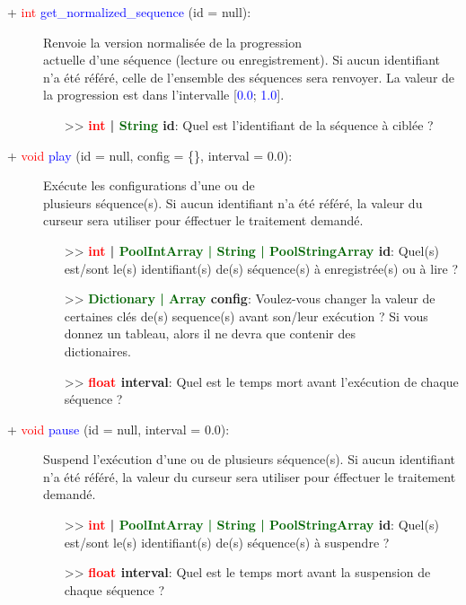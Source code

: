 \documentclass[a4paper, 11pt]{article}
\begin{document}
	\begin{description}
		\item [+ \textcolor{red}{int} \textcolor{blue}{get\_normalized\_sequence} (id = null):] Renvoie la
		version normalisée de la progression \\actuelle d'une séquence (lecture ou enregistrement). Si aucun 
		identifiant n'a été référé, celle de l'ensemble des séquences sera renvoyer. La valeur de la
		progression est dans l'intervalle [\textcolor{blue}{0.0}; \textcolor{blue}{1.0}].
		\begin{itemize}
			\item [>> \textbf{\textcolor{red}{int} | \textcolor{darkgreen}{String} id}:] Quel est
			l'identifiant de la séquence à ciblée ?\\
		\end{itemize}
	\end{description}
	\begin{description}
		\item [+ \textcolor{red}{void} \textcolor{blue}{play} (id = null, config = \{\}, interval = 0.0):]
		Exécute les configurations d'une ou de \\plusieurs séquence(s). Si aucun identifiant n'a été référé,
		la valeur du curseur sera utiliser pour éffectuer le traitement demandé.
		\begin{itemize}
			\item [>> \textbf{\textcolor{red}{int} | \textcolor{darkgreen}{PoolIntArray | String |
			PoolStringArray} id}:] Quel(s) est/sont le(s) identifiant(s) de(s) séquence(s) à enregistrée(s) 
			ou à lire ?
			\item [>> \textbf{\textcolor{darkgreen}{Dictionary | Array} config}:] Voulez-vous changer la 
			valeur de certaines clés de(s) sequence(s) avant son/leur exécution ? Si vous donnez un tableau, 
			alors il ne devra que contenir des \\dictionaires.
			\item [>> \textbf{\textcolor{red}{float} interval}:] Quel est le temps mort avant l'exécution de 
			chaque séquence ?\\
		\end{itemize}
	\end{description}
	\begin{description}
		\item [+ \textcolor{red}{void} \textcolor{blue}{pause} (id = null, interval = 0.0):] Suspend
		l'exécution d'une ou de plusieurs séquence(s). Si aucun identifiant n'a été référé, la valeur du
		curseur sera utiliser pour éffectuer le traitement demandé.
		\begin{itemize}
			\item [>> \textbf{\textcolor{red}{int} | \textcolor{darkgreen}{PoolIntArray | String |
			PoolStringArray} id}:] Quel(s) est/sont le(s) identifiant(s) de(s) séquence(s) à suspendre ?
			\item [>> \textbf{\textcolor{red}{float} interval}:] Quel est le temps mort avant la suspension 
			de chaque séquence ?\\
		\end{itemize}
	\end{description}
\end{document}
